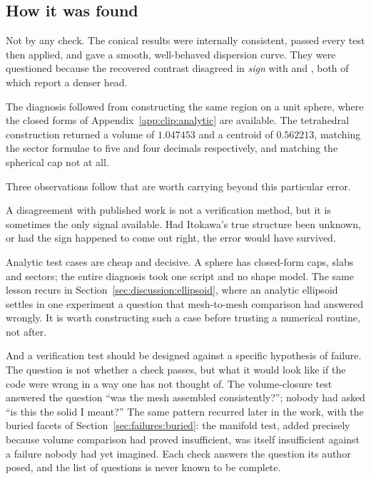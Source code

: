 \subsection{How it was found}
\label{app:cone:discovery}

Not by any check. The conical results were internally consistent, passed every
test then applied, and gave a smooth, well-behaved dispersion curve. They were
questioned because the recovered contrast disagreed in \emph{sign} with
\citet{lowry2014} and \citet{kanamaru2019}, both of which report a denser head.

The diagnosis followed from constructing the same region on a unit sphere,
where the closed forms of Appendix~\ref{app:clip:analytic} are available. The
tetrahedral construction returned a volume of $1.047453$ and a centroid of
$0.562213$, matching the sector formulae to five and four decimals
respectively, and matching the spherical cap not at all.

Three observations follow that are worth carrying beyond this particular error.

A disagreement with published work is not a verification method, but it is
sometimes the only signal available. Had Itokawa's true structure been unknown,
or had the sign happened to come out right, the error would have survived.

Analytic test cases are cheap and decisive. A sphere has closed-form caps,
slabs and sectors; the entire diagnosis took one script and no shape model. The
same lesson recurs in Section~\ref{sec:discussion:ellipsoid}, where an analytic
ellipsoid settles in one experiment a question that mesh-to-mesh comparison had
answered wrongly. It is worth constructing such a case before trusting a
numerical routine, not after.

And a verification test should be designed against a specific hypothesis of
failure. The question is not whether a check passes, but what it would look
like if the code were wrong in a way one has not thought of. The volume-closure
test answered the question ``was the mesh assembled consistently?''; nobody had
asked ``is this the solid I meant?'' The same pattern recurred later in the
work, with the buried facets of Section~\ref{sec:failures:buried}: the manifold
test, added precisely because volume comparison had proved insufficient, was
itself insufficient against a failure nobody had yet imagined. Each check
answers the question its author posed, and the list of questions is never
known to be complete.

